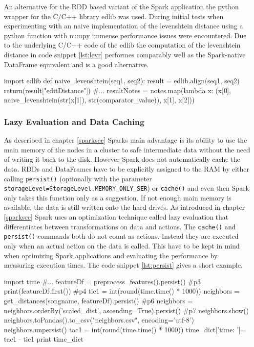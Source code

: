 \noindent An alternative for the RDD based variant of the Spark application the python wrapper for the C/C++ library edlib was used. During initial tests when experimenting with an naive implementation of the levenshtein distance using a python function with numpy immense performance issues were encountered. Due to the underlying C/C++ code of the edlib the computation of the levenshtein distance in code snippet \ref{lst:levr} performes comparably well as the Spark-native DataFrame equivalent and is a good alternative. 

\begin{pythonCode}[frame=single,label={lst:levr},caption={Levenshtein RDD},captionpos=b]
import edlib
def naive_levenshtein(seq1, seq2):
    result = edlib.align(seq1, seq2)
    return(result["editDistance"])
#...
resultNotes = notes.map(lambda x: (x[0], naive_levenshtein(str(x[1]), str(comparator_value)), x[1], x[2]))
\end{pythonCode}

\subsubsection{Lazy Evaluation and Data Caching}\label{leval}

As described in chapter \ref{sparksec} Sparks main advantage is its ability to use the main memory of the nodes in a cluster to safe intermediate data without the need of writing it back to the disk. However Spark does not automatically cache the data. RDDs and DataFrames have to be explicitly assigned to the RAM by either calling \lstinline{persist()} (optionally with the parameter \lstinline{storageLevel=StorageLevel.MEMORY_ONLY_SER}) or \lstinline{cache()} and even then Spark only takes this function only as a suggestion. If not enough main memory is available, the data is still written onto the hard drives. As introduced in chapter \ref{sparksec} Spark uses an optimization technique called lazy evaluation that differentiates between transformations on data and actions. The \lstinline{cache()} and \lstinline{persist()} commands both do not count as actions. Instead they are executed only when an actual action on the data is called. This have to be kept in mind when optimizing Spark applications and evaluating the performance by measuring execution times. The code snippet \ref{lst:persist} gives a short example. 

\begin{pythonCode}[frame=single,label={lst:persist},caption={Spark lazy evaluation},captionpos=b]
import time
#...
featureDf = preprocess_features().persist()	#p3
print(featureDf.first()) #p4
tic1 = int(round(time.time() * 1000))
neighbors = get_distances(songname, featureDf).persist() #p6
neighbors = neighbors.orderBy('scaled_dist', ascending=True).persist() #p7
neighbors.show()
neighbors.toPandas().to_csv("neighbors.csv", encoding='utf-8')
neighbors.unpersist()
tac1 = int(round(time.time() * 1000))
time_dict['time: ']= tac1 - tic1
print time_dict
\end{pythonCode}

